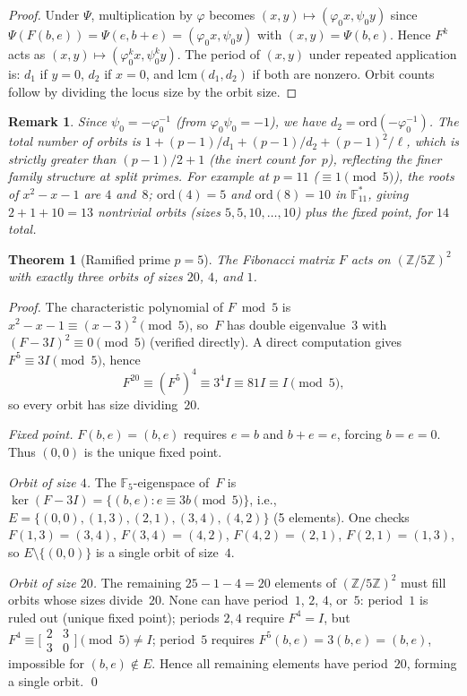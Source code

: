 \documentclass[12pt]{article}
\newtheorem{theorem}{Theorem}
\newtheorem{remark}{Remark}
\begin{document}
\begin{proof}
Under $\Psi$, multiplication by $\varphi$ becomes $(x,y)\mapsto(\varphi_0 x,\psi_0 y)$ since
$\Psi(F(b,e))=\Psi(e,b+e)=(\varphi_0 x,\psi_0 y)$ with $(x,y)=\Psi(b,e)$.
Hence $F^k$ acts as $(x,y)\mapsto(\varphi_0^k x,\psi_0^k y)$.
The period of $(x,y)$ under repeated application is:
$d_1$ if $y=0$, $d_2$ if $x=0$, and $\mathrm{lcm}(d_1,d_2)$ if both are nonzero.
Orbit counts follow by dividing the locus size by the orbit size.
\end{proof}

\begin{remark}
Since $\psi_0=-\varphi_0^{-1}$ (from $\varphi_0\psi_0=-1$), we have
$d_2=\mathrm{ord}(-\varphi_0^{-1})$.
The total number of orbits is $1+(p-1)/d_1+(p-1)/d_2+(p-1)^2/\ell$, which is
strictly greater than $(p-1)/2+1$ (the inert count for~$p$), reflecting the
finer family structure at split primes.
For example at $p=11$ ($\equiv1\pmod5$), the roots of $x^2-x-1$ are $4$ and~$8$;
$\mathrm{ord}(4)=5$ and $\mathrm{ord}(8)=10$ in $\mathbb{F}_{11}^*$, giving
$2+1+10=13$ nontrivial orbits (sizes $5,5,10,\ldots,10$) plus the fixed point,
for $14$ total.
\end{remark}

\begin{theorem}[Ramified prime $p=5$]\label{thm:ramified}
The Fibonacci matrix $F$ acts on $(\mathbb{Z}/5\mathbb{Z})^2$ with exactly three orbits
of sizes $20$, $4$, and $1$.
\end{theorem}

\begin{proof}
The characteristic polynomial of $F\bmod5$ is $x^2-x-1\equiv(x-3)^2\pmod5$,
so~$F$ has double eigenvalue~$3$ with $(F-3I)^2\equiv0\pmod5$ (verified directly).
A direct computation gives $F^5\equiv3I\pmod5$, hence
\[
  F^{20}\equiv(F^5)^4\equiv3^4 I\equiv81I\equiv I\pmod5,
\]
so every orbit has size dividing~$20$.

\textit{Fixed point.} $F(b,e)=(b,e)$ requires $e=b$ and $b+e=e$, forcing $b=e=0$.
Thus $(0,0)$ is the unique fixed point.

\textit{Orbit of size $4$.}  The $\mathbb{F}_5$-eigenspace of~$F$ is
$\ker(F-3I)=\{(b,e):e\equiv 3b\pmod5\}$,
i.e., $E=\{(0,0),(1,3),(2,1),(3,4),(4,2)\}$ (5 elements).
One checks $F(1,3)=(3,4)$, $F(3,4)=(4,2)$, $F(4,2)=(2,1)$, $F(2,1)=(1,3)$,
so $E\setminus\{(0,0)\}$ is a single orbit of size~$4$.

\textit{Orbit of size $20$.}  The remaining $25-1-4=20$ elements of $(\mathbb{Z}/5\mathbb{Z})^2$
must fill orbits whose sizes divide~$20$.  None can have period~$1$, $2$, $4$, or~$5$:
period~$1$ is ruled out (unique fixed point); periods $2,4$ require $F^4=I$, but
$F^4\equiv\bigl[\begin{smallmatrix}2&3\\3&0\end{smallmatrix}\bigr]\pmod5\ne I$;
period~$5$ requires $F^5(b,e)=3(b,e)=(b,e)$, impossible for $(b,e)\notin E$.
Hence all remaining elements have period~$20$, forming a single orbit. \qed
\end{proof}
\end{document}

